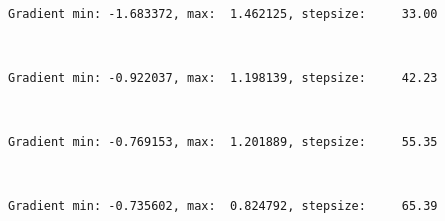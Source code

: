 \documentclass[11pt]{article}
\begin{document}
    \begin{center}
    \end{center}
    { \hspace*{\fill} \\}
    
    \begin{Verbatim}[commandchars=\\\{\}]
Gradient min: -1.683372, max:  1.462125, stepsize:     33.00

    \end{Verbatim}

    \begin{center}
    \end{center}
    { \hspace*{\fill} \\}
    
    \begin{Verbatim}[commandchars=\\\{\}]
Gradient min: -0.922037, max:  1.198139, stepsize:     42.23

    \end{Verbatim}

    \begin{center}
    \end{center}
    { \hspace*{\fill} \\}
    
    \begin{Verbatim}[commandchars=\\\{\}]
Gradient min: -0.769153, max:  1.201889, stepsize:     55.35

    \end{Verbatim}

    \begin{center}
    \end{center}
    { \hspace*{\fill} \\}
    
    \begin{Verbatim}[commandchars=\\\{\}]
Gradient min: -0.735602, max:  0.824792, stepsize:     65.39

    \end{Verbatim}
\end{document}
